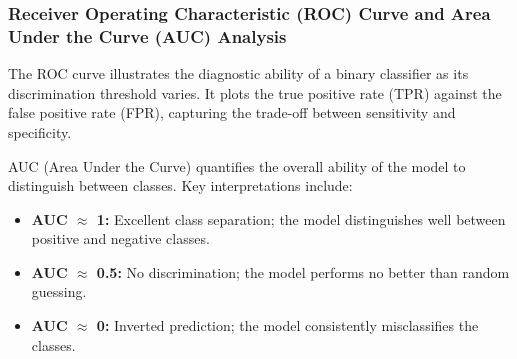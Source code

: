\documentclass[10pt,twocolumn]{article}
\begin{document}



\subsubsection{Receiver Operating Characteristic (ROC) Curve and Area Under the Curve (AUC) Analysis}

The ROC curve illustrates the diagnostic ability of a binary classifier as its discrimination threshold varies. It plots the true positive rate (TPR) against the false positive rate (FPR), capturing the trade-off between sensitivity and specificity.

AUC (Area Under the Curve) quantifies the overall ability of the model to distinguish between classes. Key interpretations include:

\begin{itemize}
\item \textbf{AUC $\approx$ 1:} Excellent class separation; the model distinguishes well between positive and negative classes.
\item \textbf{AUC $\approx$ 0.5:} No discrimination; the model performs no better than random guessing.
\item \textbf{AUC $\approx$ 0:} Inverted prediction; the model consistently misclassifies the classes.
\end{itemize}
\end{document}
